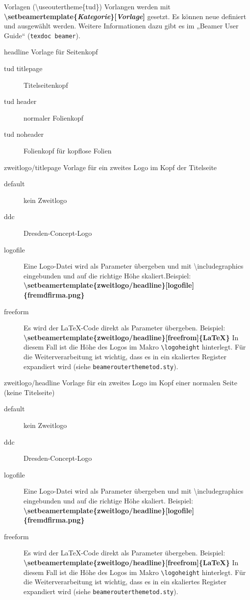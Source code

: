 \documentclass[presentation,t]{beamer}
\begin{document}
\begin{frame}[allowframebreaks,label=sec-2-2-4]{Vorlagen (\textbackslash useoutertheme\{tud\})}
Vorlangen werden mit 
\textbf{\textbackslash setbeamertemplate\{\emph{Kategorie}\}[\emph{Vorlage}]}
gesetzt. Es können neue
definiert und ausgewählt werden. Weitere Informationen dazu gibt es im
„Beamer User Guide“ (\texttt{texdoc beamer}).
\begin{block}{headline}
Vorlage für Seitenkopf
\begin{description}
\item[{tud titlepage}] Titelseitenkopf
\item[{tud header}] normaler Folienkopf
\item[{tud noheader}] Folienkopf für kopflose Folien
\end{description}
\end{block}

\begin{block}{zweitlogo/titlepage}
Vorlage für ein zweites Logo im Kopf der Titelseite
\begin{description}
\item[{default}] kein Zweitlogo
\item[{ddc}] Dresden-Concept-Logo
\item[{logofile}] Eine Logo-Datei wird als Parameter übergeben und mit
\textbackslash includegraphics eingebunden und auf die
richtige Höhe skaliert.Beispiel: 
\textbf{\textbackslash setbeamertemplate\{zweitlogo/headline\}[logofile]\{fremdfirma.png\}}
\item[{freeform}] Es wird der \LaTeX -Code direkt als Parameter übergeben. Beispiel:
\textbf{\textbackslash setbeamertemplate\{zweitlogo/headline\}[freefrom]\{\LaTeX\}}
In diesem Fall ist die Höhe des Logos im Makro
\texttt{\textbackslash logoheight} hinterlegt. Für die
Weiterverarbeitung ist wichtig, dass es in ein
skaliertes Register expandiert wird (siehe
\texttt{beamerouterthemetod.sty}).
\end{description}
\end{block}

\begin{block}{zweitlogo/headline}
Vorlage für ein zweites Logo im Kopf einer normalen Seite (keine Titelseite)
\begin{description}
\item[{default}] kein Zweitlogo
\item[{ddc}] Dresden-Concept-Logo
\item[{logofile}] Eine Logo-Datei wird als Parameter übergeben und mit
\textbackslash includegraphics eingebunden und auf die
richtige Höhe skaliert. Beispiel: 
\textbf{\textbackslash setbeamertemplate\{zweitlogo/headline\}[logofile]\{fremdfirma.png\}}
\item[{freeform}] Es wird der \LaTeX -Code direkt als Parameter übergeben. Beispiel:
\textbf{\textbackslash setbeamertemplate\{zweitlogo/headline\}[freefrom]\{\LaTeX\}}
In diesem Fall ist die Höhe des Logos im Makro
\texttt{\textbackslash logoheight} hinterlegt. Für die
Weiterverarbeitung ist wichtig, dass es in ein
skaliertes Register expandiert wird (siehe
\texttt{beamerouterthemetod.sty}).
\end{description}
\end{block}


\end{frame}
\end{document}
